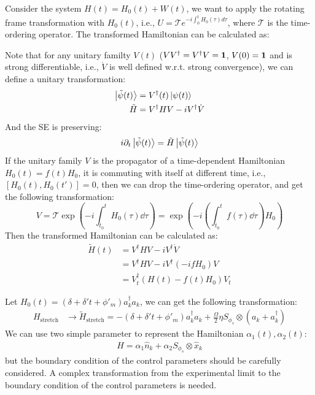 \documentclass{simple-notes}
\begin{document}
\begin{notebox}[title=Rotating Frame Transformation]
    Consider the system $H(t) = H_0(t) + W(t)$, we want to apply the rotating frame transformation with $H_0(t)$, i.e., $U = \mathcal{T} e^{-i \int_0^t H_0(\tau) d\tau}$, where $\mathcal{T}$ is the time-ordering operator. The transformed Hamiltonian can be calculated as:

Note that for any unitary familty $V(t)$ ($VV^\dagger = V^\dagger V = \vb 1$,  $V(0) = \vb 1$ and is strong differentiable, i.e., $\dot V$ is well defined w.r.t. strong convergence), we can define a unitary transformation:
\begin{align*}
    \ket{\tilde\psi(t)} &= V^\dagger(t)\ket{\psi(t)}\\
    \tilde H &= V^\dagger H V - i V^\dagger \dot V 
\end{align*}
And the SE is preserving:
\begin{align*}
    i\partial_t \ket{\tilde\psi(t)} = \tilde H \ket{\tilde\psi(t)}
\end{align*}
If the unitary family $V$ is the propagator of a time-dependent Hamiltonian $H_0(t) = f(t)H_0$, it is commuting with itself at different time, i.e., $[H_0(t), H_0(t')] = 0$, then we can drop the time-ordering operator, and get the following transformation:
\begin{equation}
    V = \mathcal{T}\exp(-i \int_{t_0}^{t}H_0(\tau)\dd \tau) = \exp(-i(\int_{t_0}^{t}f(\tau)\dd \tau)H_0)
\end{equation}
Then the transformed Hamiltonian can be calculated as:
\begin{align*}
    \tilde H(t) &= V^\dagger H V - i V^\dagger \dot V \\
    &= V^\dagger H V - i V^\dagger (-ifH_0)V\\
    &= V_t^\dagger (H(t) - f(t)H_0) V_t
\end{align*}
\end{notebox}

Let $H_0(t) = (\delta + \delta't + \phi'_m)  a_k^\dagger a_k$, we can get the following transformation:
\begin{align*}
    H_{\text{stretch}} & \to \tilde H_{\text{stretch}} = - (\delta + \delta't + \phi'_m)a_k^\dagger a_k + \frac{\Omega}{2} \eta S_{\phi_s} \otimes (a_k + a_k^\dagger)
\end{align*}
We can use two simple parameter to represent the Hamiltonian $\alpha_1(t),\alpha_2(t)$:
\begin{align*}
    H = \alpha_1 \hat n_k + \alpha_2 S_{\phi_s} \otimes \hat x_k
\end{align*}
but the boundary condition of the control parameters should be carefully considered. A complex transformation from the experimental limit to the boundary condition of the control parameters is needed.
\end{document}
